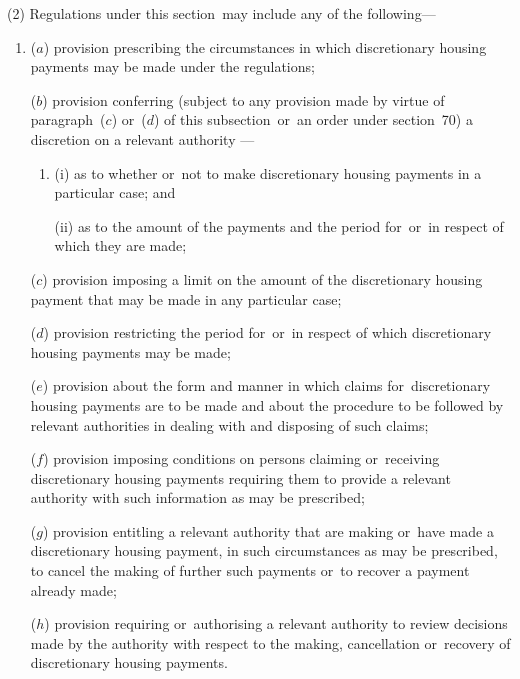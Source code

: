 \documentclass[12pt,a4paper]{article}
\begin{document}
(2) Regulations under this section~may include any of the following—
\begin{enumerate}\item[]
($a$) provision prescribing the circumstances in which discretionary housing payments may be made under the regulations;

($b$) provision conferring (subject to any provision made by virtue of paragraph~($c$)  or~($d$)  of this subsection~or~an order under section~70) a discretion on a 
relevant authority%
—
\begin{enumerate}\item[]
(i) as to whether or~not to make discretionary housing payments in a particular case; and

(ii) as to the amount of the payments and the period for~or~in respect of which they are made;
\end{enumerate}

($c$) provision imposing a limit on the amount of the discretionary housing payment that may be made in any particular case;

($d$) provision restricting the period for~or~in respect of which discretionary housing payments may be made;

($e$) provision about the form and manner in which claims for~discretionary housing payments are to be made and about the procedure to be followed by 
relevant authorities 
in dealing with and disposing of such claims;

($f$) provision imposing conditions on persons claiming or~receiving discretionary housing payments requiring them to provide a 
relevant authority
with such information as may be prescribed;

($g$) provision entitling a 
relevant authority
that are making or~have made a discretionary housing payment, in such circumstances as may be prescribed, to cancel the making of further such payments or~to recover a payment already made;

($h$) provision requiring or~authorising a 
relevant authority
to review decisions made by the authority with respect to the making, cancellation or~recovery of discretionary housing payments.
\end{enumerate}
\end{document}
